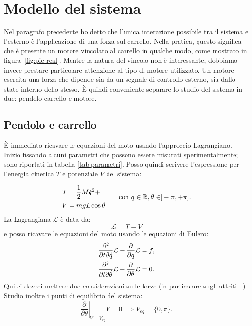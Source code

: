 \section{Modello del sistema}
Nel paragrafo precedente ho detto che l'unica interazione possibile tra il sistema
e l'esterno è l'applicazione di una forza sul carrello.
Nella pratica, questo significa che è presente un motore vincolato al carrello
in qualche modo, come mostrato in figura~\ref{fig:pic-real}.
Mentre la natura del vincolo non è interessante, dobbiamo invece prestare
particolare attenzione al tipo di motore utilizzato.
Un motore esercita una forza che dipende sia da un segnale di controllo esterno,
sia dallo stato interno dello stesso.
È quindi conveniente separare lo studio del sistema in due:
pendolo-carrello e motore.

\subsection{Pendolo e carrello}
È immediato ricavare le equazioni del moto usando l'approccio Lagrangiano. Inizio fissando alcuni parametri che possono essere misurati sperimentalmente; sono riportati in tabella \ref{tab:parametri}. Posso quindi scrivere l'espressione per l'energia cinetica $T$ e potenziale $V$ del sistema:

\begin{equation*}
    \begin{aligned}
        T &= \frac 1 2 M  \dot q^2 +  \\ %
        V &= mgL \cos\theta
    \end{aligned}
    \hspace{20pt} \text{con } q \in \R, \theta \in ]-\pi, +\pi].
    \label{eq:energy}
\end{equation*}
La Lagrangiana $\mathcal L$ è data da:
\begin{equation*}
    \mathcal L = T - V
\end{equation*}
e posso ricavare le equazioni del moto usando le equazioni di Eulero:
\begin{equation*}
    \begin{aligned}
        \frac{\partial^2}{\partial t \partial \dot q} \mathcal L - \frac \partial {\partial q} \mathcal L &= f, \\
        \frac{\partial^2}{\partial t \partial \dot \theta} \mathcal L  - \frac \partial {\partial \theta} \mathcal L &= 0.
    \end{aligned}
    \label{eq:moto-sistema}
\end{equation*}
Qui ci dovrei mettere due considerazioni sulle forze (in particolare sugli attriti...)
Studio inoltre i punti di equilibrio del sistema:
\begin{equation*}
    \left. \frac \partial {\partial \theta}\right |_{V=V_{eq}} V =  0 \implies V_{eq} = \{0, \pi\}.
\end{equation*}



